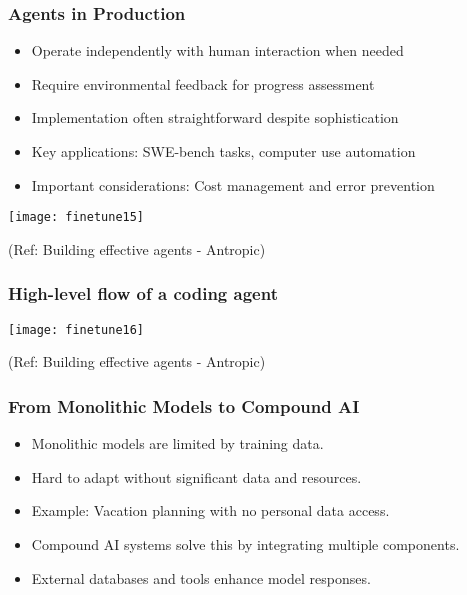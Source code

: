 \begin{frame}[fragile]\frametitle{Agents in Production}
    \begin{itemize}
        \item Operate independently with human interaction when needed
        \item Require environmental feedback for progress assessment
        \item Implementation often straightforward despite sophistication
        \item Key applications: SWE-bench tasks, computer use automation
        \item Important considerations: Cost management and error prevention
    \end{itemize}
	
	\begin{center}
	\texttt{[image: finetune15]}
	\end{center}

	{\tiny (Ref: Building effective agents - Antropic)}		
\end{frame}

\begin{frame}[fragile]\frametitle{High-level flow of a coding agent}

	\begin{center}
	\texttt{[image: finetune16]}
	\end{center}

	{\tiny (Ref: Building effective agents - Antropic)}		
\end{frame}



\begin{frame}[fragile]\frametitle{From Monolithic Models to Compound AI}
    \begin{itemize}
        \item Monolithic models are limited by training data.
        \item Hard to adapt without significant data and resources.
        \item Example: Vacation planning with no personal data access.
        \item Compound AI systems solve this by integrating multiple components.
        \item External databases and tools enhance model responses.
    \end{itemize}
\end{frame}

